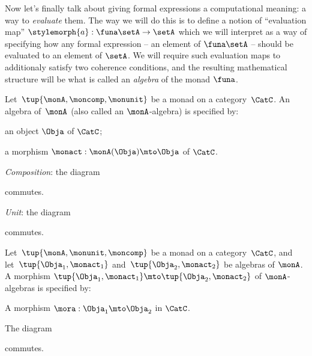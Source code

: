 Now let's finally talk about giving formal expressions a computational meaning: a way to \emph{evaluate} them. The way we will do this is to define a notion of ``evaluation map'' $\stylemorph{a}: \funa \setA \to \setA$ which we will interpret as a way of specifying how any formal expression -- an element of $\funa \setA$ -- should be evaluated to an element of $\setA$. We will require such evaluation maps to additionaly satisfy two coherence conditions, and the resulting mathematical structure will be what is called an \emph{algebra} of the monad $\funa$. 



\begin{ctdefinition}
    \label{def:algebramon}
Let~$\tup{\monA, \moncomp, \monunit}$ be a monad on a category~$\CatC$. An algebra of~$\monA$ (also called an $\monA$-algebra) is specified by: \

\constit
\begin{compactenum}
\item an object $\Obja$ of $\CatC$;
\item a morphism $\monact: \monA(\Obja) \mto \Obja$ of $\CatC$.
\end{compactenum}
\condit
\begin{compactenum}
\item \emph{Composition}: the diagram
\begin{center}
  \end{center}
commutes.
\item \emph{Unit}: the diagram 
\begin{center}
  \end{center}
commutes.
\end{compactenum}
\end{ctdefinition}


\begin{ctdefinition}
    \label{def:algebramorphism}
Let~$\tup{\monA, \monunit, \moncomp}$ be a monad on a category~$\CatC$, and let~$\tup{\Obja_1, \monact_1}$ and~$\tup{\Obja_2, \monact_2}$ be algebras of $\monA$. A morphism $\tup{\Obja_1, \monact_1} \mto \tup{\Obja_2, \monact_2}$ of $\monA$-algebras is specified by: \

\constit
\begin{compactenum}
\item A morphism $\mora : \Obja_1 \mto \Obja_2$ in $\CatC$.
\end{compactenum}
\condit
\begin{compactenum}
\item The diagram
\begin{center}
  \end{center}
commutes. 
\end{compactenum}
\end{ctdefinition}


